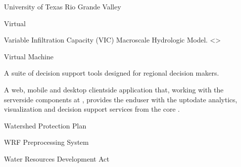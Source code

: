\documentclass[letterpaper,12pt,english,openany,oneside]{sphinxmanual}
\begin{document}
\begin{description}
\sphinxAtStartPar
University of Texas Rio Grande Valley

\sphinxAtStartPar
Virtual {\hyperref[\detokenize{glossary:term-CPU}]{}}

\sphinxAtStartPar
Variable Infiltration Capacity (VIC) Macroscale Hydrologic Model.  \textless{}\textgreater{}

\sphinxAtStartPar
Virtual Machine

\sphinxAtStartPar
A suite of decision support tools designed for regional decision makers.

\sphinxAtStartPar
A web, mobile and desktop client\sphinxhyphen{}side application that, working with the server\sphinxhyphen{}side components at {\hyperref[\detokenize{glossary:term-RGVFlood.com}]{}}, provides the end\sphinxhyphen{}user with the up\sphinxhyphen{}to\sphinxhyphen{}date analytics, visualization and decision support services from the core {\hyperref[\detokenize{glossary:term-REON.cc}]{}} {\hyperref[\detokenize{glossary:term-CI}]{}}.

\sphinxAtStartPar
Watershed Protection Plan

\sphinxAtStartPar
WRF Preprocessing System

\sphinxAtStartPar
Water Resources Development Act


\end{description}
\end{document}
